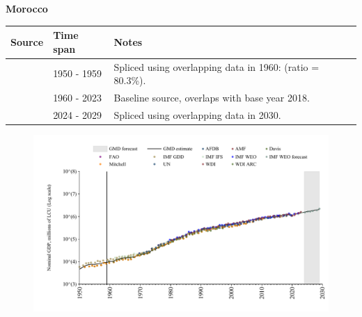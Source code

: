 \documentclass[12pt,a4paper,landscape]{article}
\begin{document}
\begin{adjustbox}{max totalsize={\paperwidth}{\paperheight},center}
\begin{minipage}[t][\textheight][t]{\textwidth}
\vspace*{0.5cm}
{}
\begin{center}
{\Large\bfseries Morocco}
\end{center}
\vspace{0.5cm}
\begin{table}[H]
\centering
\small
\begin{tabular}{|l|l|l|}
\hline
\textbf{Source} & \textbf{Time span} & \textbf{Notes} \\
\hline
\rowcolor{white}\cite{IMF_GDD}& 1950 - 1959 &Spliced using overlapping data in 1960: (ratio = 80.3\%).\\
\rowcolor{lightgray}\cite{WDI}& 1960 - 2023 &Baseline source, overlaps with base year 2018.\\
\rowcolor{white}\cite{IMF_WEO_forecast}& 2024 - 2029 &Spliced using overlapping data in 2030.\\
\hline
\end{tabular}
\end{table}
\begin{figure}[H]
\centering
\includegraphics[width=\textwidth,height=0.6\textheight,keepaspectratio]{graphs/MAR_nGDP.pdf}
\end{figure}
\end{minipage}
\end{adjustbox}
\end{document}
